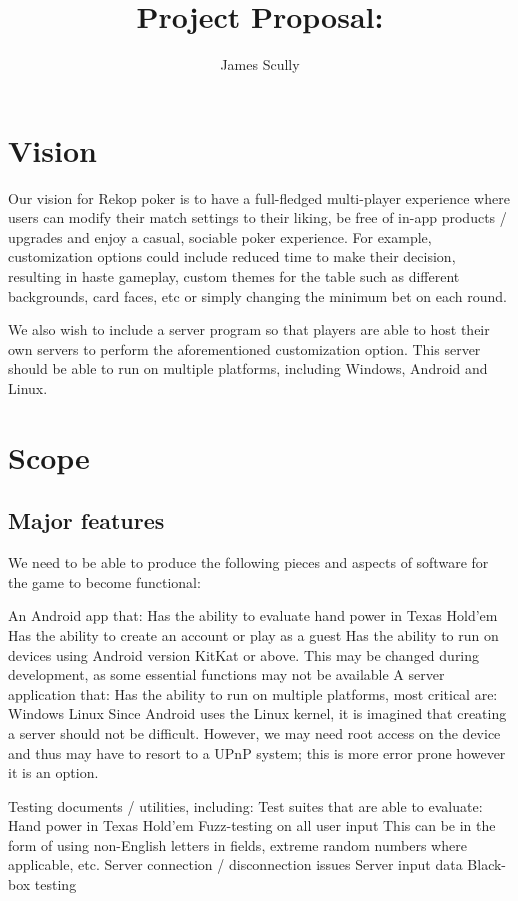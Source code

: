 \documentclass[11pt]{article}
\title{Project Proposal: \pt}
\author{James Scully}
\begin{document}
\section*{Vision}
Our vision for Rekop poker is to have a full-fledged multi-player experience where users can modify their match settings to their liking, be free of in-app products / upgrades and enjoy a casual, sociable poker experience. For example, customization options could include reduced time to make their decision, resulting in haste gameplay, custom themes for the table such as different backgrounds, card faces, etc or simply changing the minimum bet on each round. 

We also wish to include a server program so that players are able to host their own servers to perform the aforementioned customization option. This server should be able to run on multiple platforms, including Windows, Android and Linux. 



\section*{Scope}

\subsection*{Major features}


We need to be able to produce the following pieces and aspects of software for the game to become functional:
	\begin{outline}
		\1 An Android app that:
			\2 Has the ability to evaluate hand power in Texas Hold'em
			\2 Has the ability to create an account or play as a guest
			\2 Has the ability to run on devices using Android version KitKat or above.
				\3 This may be changed during development, as some essential functions may not be available
		\1 A server application that:
			\2 Has the ability to run on multiple platforms, most critical are: 
				\3 Windows
				\3 Linux
				\3 Since Android uses the Linux kernel, it is imagined that creating a server should not be difficult. However, we may need root access on the device and thus may have to resort to a UPnP system; this is more error prone however it is an option.
				
		\1 Testing documents / utilities, including:
			\2 Test suites that are able to evaluate:
				\3 Hand power in Texas Hold'em
				\3 Fuzz-testing on all user input
					\4 This can be in the form of using non-English letters in fields, extreme random numbers where applicable, etc.
				\3 Server connection / disconnection issues
				\3 Server input data
			\2 Black-box testing
				\3 
								
			 
	\end{outline}
\end{document}
